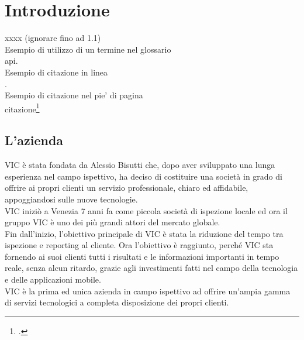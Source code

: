 
\chapter{Introduzione}
\label{cap:introduzione}
xxxx (ignorare fino ad 1.1)\\


\noindent Esempio di utilizzo di un termine nel glossario \\
\gls{api}. \\

\noindent Esempio di citazione in linea \\
\cite{site:agile-manifesto}. \\

\noindent Esempio di citazione nel pie' di pagina \\
citazione\footcite{womak:lean-thinking} \\

\section{L'azienda}

VIC è stata fondata da Alessio Bisutti che, dopo aver sviluppato una lunga esperienza nel campo ispettivo, ha deciso di costituire una società in grado di offrire ai propri clienti un servizio professionale, chiaro ed affidabile, appoggiandosi sulle nuove tecnologie.\\
VIC iniziò a Venezia 7 anni fa come piccola società di ispezione locale ed ora il gruppo VIC è uno dei più grandi attori del mercato globale.\\
Fin dall'inizio, l'obiettivo principale di VIC è stata la riduzione del tempo tra ispezione e reporting al cliente. Ora l'obiettivo è raggiunto, perché VIC sta fornendo ai suoi clienti tutti i risultati e le informazioni importanti in tempo reale, senza alcun ritardo, grazie agli investimenti fatti nel campo della tecnologia e delle applicazioni mobile.\\
VIC è la prima ed unica azienda in campo ispettivo ad offrire un'ampia gamma di servizi tecnologici a completa disposizione dei propri clienti. 

